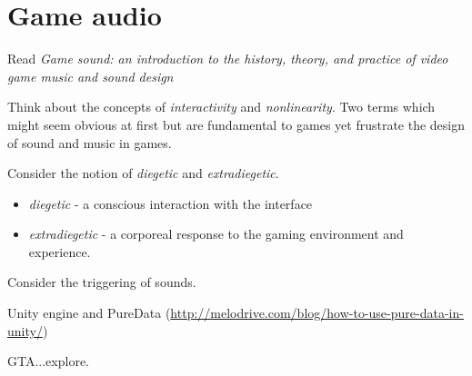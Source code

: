 
\chapter{Game audio}
\label{games}


Read \textit{Game sound: an introduction to the history, theory, and practice of video game music and sound design} \citep{collins2008game}

Think about the concepts of \textit{interactivity} and \textit{nonlinearity}. Two terms which might seem obvious at first but are fundamental to games yet frustrate the design of sound and music in games. 

Consider the notion of \textit{diegetic} and \textit{extradiegetic}. 
\begin{itemize}
\item \textit{diegetic} - a conscious interaction with the interface
\item \textit{extradiegetic} - a corporeal response to the gaming environment and experience. 
\end{itemize}

Consider the triggering of sounds. 

Unity engine and PureData (\url{http://melodrive.com/blog/how-to-use-pure-data-in-unity/})

GTA...explore.

